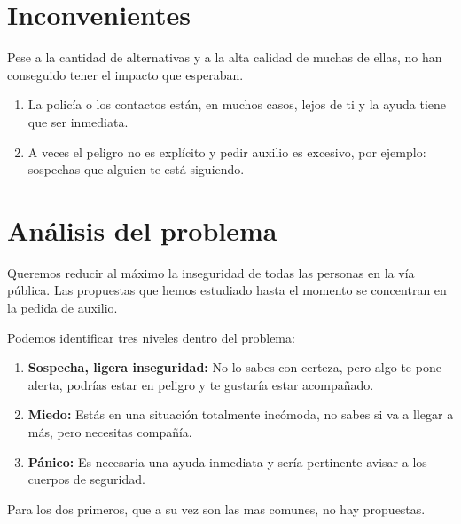 \section{Inconvenientes}
Pese a la cantidad de alternativas y a la alta calidad de muchas de ellas, no han conseguido tener el impacto que esperaban.
\begin{enumerate}
  \item La policía o los contactos están, en muchos casos, lejos de ti y la ayuda tiene que ser inmediata.
  \item A veces el peligro no es explícito y pedir auxilio es excesivo, por ejemplo: sospechas que alguien te está siguiendo.
\end{enumerate}

\section{Análisis del problema}
Queremos reducir al máximo la inseguridad de todas las personas en la vía pública.
Las propuestas que hemos estudiado hasta el momento se concentran en la pedida de auxilio.

Podemos identificar tres niveles dentro del problema:
\begin{enumerate}
  \item \textbf{Sospecha, ligera inseguridad:} No lo sabes con certeza, pero algo te pone alerta, podrías estar en peligro y te gustaría estar acompañado.
  \item \textbf{Miedo:} Estás en una situación totalmente incómoda, no sabes si va a llegar a más, pero necesitas compañía.
  \item \textbf{Pánico:} Es necesaria una ayuda inmediata y sería pertinente avisar a los cuerpos de seguridad.
\end{enumerate}

Para los dos primeros, que a su vez son las mas comunes, no hay propuestas.

